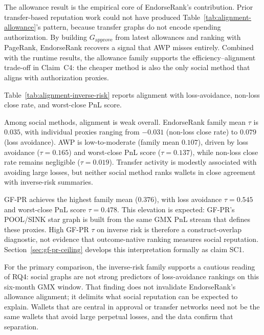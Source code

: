 The allowance result is the empirical core of EndorseRank's contribution. Prior transfer-based reputation work could not have produced Table~\ref{tab:alignment-allowance}'s pattern, because transfer graphs do not encode spending authorization. By building $G_{\text{approve}}$ from latest allowances and ranking with PageRank, EndorseRank recovers a signal that AWP misses entirely. Combined with the runtime results, the allowance family supports the efficiency--alignment trade-off in Claim~C4: the cheaper method is also the only social method that aligns with authorization proxies.


Table~\ref{tab:alignment-inverse-risk} reports alignment with loss-avoidance, non-loss close rate, and worst-close PnL score.



Among social methods, alignment is weak overall. EndorseRank family mean $\tau$ is $0.035$, with individual proxies ranging from $-0.031$ (non-loss close rate) to $0.079$ (loss avoidance). AWP is low-to-moderate (family mean $0.107$), driven by loss avoidance ($\tau=0.165$) and worst-close PnL score ($\tau=0.137$), while non-loss close rate remains negligible ($\tau=0.019$). Transfer activity is modestly associated with avoiding large losses, but neither social method ranks wallets in close agreement with inverse-risk summaries.

GF-PR achieves the highest family mean ($0.376$), with loss avoidance $\tau=0.545$ and worst-close PnL score $\tau=0.478$. This elevation is expected: GF-PR's POOL/SINK star graph is built from the same GMX PnL stream that defines these proxies. High GF-PR $\tau$ on inverse risk is therefore a construct-overlap diagnostic, not evidence that outcome-native ranking measures social reputation. Section~\ref{sec:gf-pr-ceiling} develops this interpretation formally as claim SC1.

For the primary comparison, the inverse-risk family supports a cautious reading of RQ4: social graphs are not strong predictors of loss-avoidance rankings on this six-month GMX window. That finding does not invalidate EndorseRank's allowance alignment; it delimits what social reputation can be expected to explain. Wallets that are central in approval or transfer networks need not be the same wallets that avoid large perpetual losses, and the data confirm that separation.

